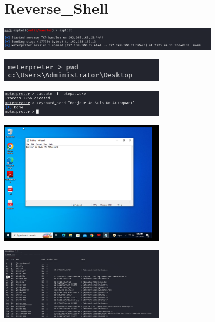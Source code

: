 \section{Reverse\_Shell}

\begin{center}
    \includegraphics[width=0.8\textwidth]{Question/SC/18_kali.PNG}
\end{center}

\vspace{0.15cm}

\begin{center}
    \includegraphics[width=0.6\textwidth]{Question/SC/19_0.PNG}
\end{center}

\vspace{0.15cm}

\begin{center}
    \includegraphics[width=0.6\textwidth]{Question/SC/19.PNG}
\end{center}

\vspace{0.15cm}
\begin{center}
    \includegraphics[width=0.6\textwidth]{Question/SC/19_2.PNG}
\end{center}

\vspace{0.15cm}
\begin{center}
    \includegraphics[width=0.6\textwidth]{Question/SC/20_1.PNG}
\end{center}

